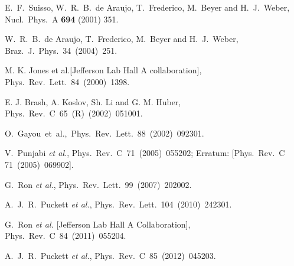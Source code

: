 \documentclass[preprint,aps,showpacs,floatfix]{revtex4}
\begin{document}
\begin{thebibliography}{99}
  E.~F.~Suisso, W.~R.~B.~de Araujo, T.~Frederico, M.~Beyer and H.~J.~Weber,
  Nucl.\ Phys.\ A {\bf 694} (2001) 351.
  

 W.~R.~B.~de Araujo, T.~Frederico, M.~Beyer and H.~J.~Weber,
 Braz.~J.~Phys.~34~(2004)~251.

 
 
 M. K. Jones et al.[Jefferson Lab Hall A collaboration],
Phys.~Rev.~Lett.~84~(2000)~1398.


 E. J. Brash, A. Koslov, Sh. Li and G. M. Huber,
Phys.~Rev.~C~65~(R)~(2002)~051001.


 O.~Gayou~et~al.,~Phys.~Rev.~Lett.~88~(2002)~092301.


  V.~Punjabi {\it et al.},
  Phys.~Rev.~C~71~(2005)~055202;  Erratum: [Phys.\ Rev.\ C 71~(2005)~069902]. 
  
 
  G.~Ron {\it et al.},
  Phys.~Rev.~Lett.~99~(2007)~202002.  %
  

  A.~J.~R.~Puckett {\it et al.},
  Phys.~Rev.~Lett.~104~(2010)~242301.  %
  
  G.~Ron {\it et al.} [Jefferson Lab Hall A Collaboration],
  Phys.~Rev.~C~84~(2011)~055204.  %
  
  A.~J.~R.~Puckett {\it et al.},
  Phys.\ Rev.\ C~85~(2012)~045203. %
  

\end{thebibliography}
\end{document}
